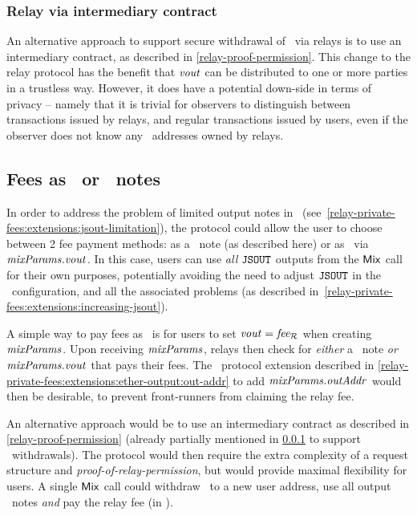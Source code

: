 \subsubsection{Relay via intermediary contract}\label{relay-private-fees:extensions:ether-output:intermediary}

An alternative approach to support secure withdrawal of \ether~via relays is to use an intermediary contract, as described in \cref{relay-proof-permission}. This change to the relay protocol has the benefit that $\mathit{vout}$ can be distributed to one or more parties in a trustless way. However, it does have a potential down-side in terms of privacy -- namely that it is trivial for observers to distinguish between transactions issued by relays, and regular transactions issued by users, even if the observer does not know any \ethereum~addresses owned by relays.

\subsection{Fees as \ether~or \zeth~notes}

In order to address the problem of limited output notes in \zeth~(see~\cref{relay-private-fees:extensions:jsout-limitation}), the protocol could allow the user to choose between 2 fee payment methods: as a \zeth~note (as described here) or as \ether~via $\mathit{mixParams}.\mathit{vout}$. In this case, users can use \emph{all} $\mathtt{JSOUT}$ outputs from the $\mathsf{Mix}$ call for their own purposes, potentially avoiding the need to adjust $\mathtt{JSOUT}$ in the \zeth~configuration, and all the associated problems (as described in~\cref{relay-private-fees:extensions:increasing-jsout}).

A simple way to pay fees as \ether~is for users to set $\mathit{vout} = \mathit{fee_{\mathcal{R}}}$ when creating $\mathit{mixParams}$. Upon receiving $\mathit{mixParams}$, relays then check for \emph{either} a \zeth~note \emph{or} $\mathit{mixParams}.\mathit{vout}$ that pays their fees. The \zeth~protocol extension described in \cref{relay-private-fees:extensions:ether-output:out-addr} to add $\mathit{mixParams}.\mathit{outAddr}$ would then be desirable, to prevent front-runners from claiming the relay fee.

An alternative approach would be to use an intermediary contract as described in \cref{relay-proof-permission} (already partially mentioned in \cref{relay-private-fees:extensions:ether-output:intermediary} to support \ether~withdrawals). The protocol would then require the extra complexity of a request structure and \emph{proof-of-relay-permission}, but would provide maximal flexibility for users. A single $\mathsf{Mix}$ call could withdraw \ether~to a new user address, use all output \zeth~notes \emph{and} pay the relay fee (in \ether).

